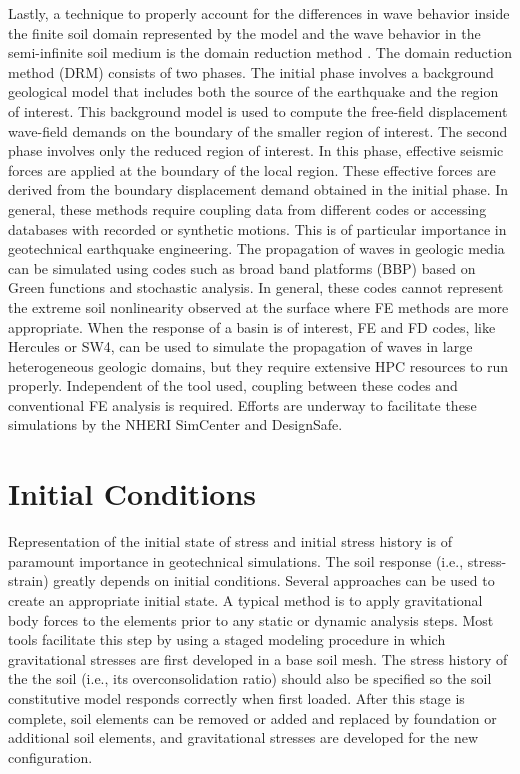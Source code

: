 Lastly, a technique to properly account for the diﬀerences in wave behavior inside the ﬁnite soil domain represented by the model and the wave behavior in the semi-inﬁnite soil medium is the domain reduction method \citep{Bielak03, Yoshimura03}. The domain reduction method (DRM) consists of two phases. The initial phase involves a background geological model that includes both the source of the earthquake and the region of interest. This background model is used to compute the free-ﬁeld displacement wave-ﬁeld demands on the boundary of the smaller region of interest. The second phase involves only the reduced region of interest. In this phase, eﬀective seismic forces are applied at the boundary of the local region. These eﬀective forces are derived from the boundary displacement demand obtained in the initial phase. In general, these methods require coupling data from different codes or accessing databases with recorded or synthetic motions. This is of particular importance in geotechnical earthquake engineering. The propagation of waves in geologic media can be simulated using codes such as broad band platforms (BBP) based on Green functions and stochastic analysis. In general, these codes cannot represent the extreme soil nonlinearity observed at the surface where FE methods are more appropriate. When the response of a basin is of interest, FE and FD codes, like Hercules or SW4, can be used to simulate the propagation of waves in large heterogeneous geologic domains, but they require extensive HPC resources to run properly. Independent of the tool used, coupling between these codes and conventional FE analysis is required. Efforts are underway to facilitate these simulations by the NHERI SimCenter and DesignSafe.

\section{Initial Conditions}
\label{sec:resp_geotech_6}

Representation of the initial state of stress and initial stress history is of paramount importance in geotechnical simulations. The soil response (i.e., stress-strain) greatly depends on initial conditions. Several approaches can be used to create an appropriate initial state. A typical method is to apply gravitational body forces to the elements prior to any static or dynamic analysis steps. Most tools facilitate this step by using a staged modeling procedure in which gravitational stresses are ﬁrst developed in a base soil mesh. The stress history of the the soil (i.e., its overconsolidation ratio) should also be specified so the soil constitutive model responds correctly when first loaded. After this stage is complete, soil elements can be removed or added and replaced by foundation or additional soil elements, and gravitational stresses are developed for the new conﬁguration.

